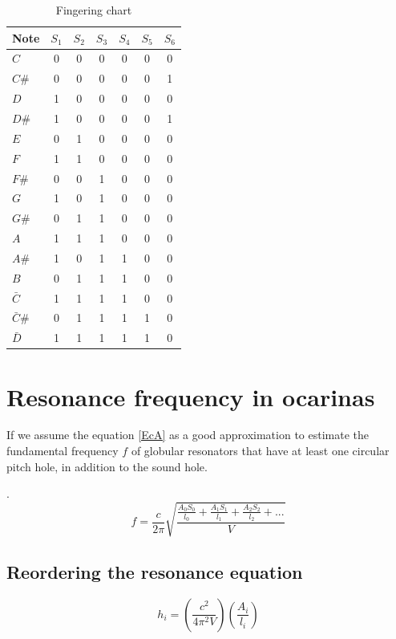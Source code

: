 \documentclass{article}
\begin{document}
\begin{table}[h]
\center
\begin{tabular}{l|c|c|c|c|c|c}
Note & $S_1$ & $S_2$ & $S_3$ & $S_4$ & $S_5$ & $S_6$ \\ \hline
\hline 
$C$  & 0 & 0 & 0 & 0 & 0 & 0 \\
$C\#$& 0 & 0 & 0 & 0 & 0 & 1 \\
$D$  & 1 & 0 & 0 & 0 & 0 & 0 \\
$D\#$& 1 & 0 & 0 & 0 & 0 & 1 \\
$E$  & 0 & 1 & 0 & 0 & 0 & 0 \\
$F$  & 1 & 1 & 0 & 0 & 0 & 0 \\
$F\#$& 0 & 0 & 1 & 0 & 0 & 0 \\
$G$  & 1 & 0 & 1 & 0 & 0 & 0 \\
$G\#$& 0 & 1 & 1 & 0 & 0 & 0 \\
$A$  & 1 & 1 & 1 & 0 & 0 & 0 \\
$A\#$& 1 & 0 & 1 & 1 & 0 & 0 \\
$B$  & 0 & 1 & 1 & 1 & 0 & 0 \\
$\bar{C}$& 1 & 1 & 1 & 1 & 0 & 0 \\
$\bar{C}\#$& 0 & 1 & 1 & 1 & 1 & 0 \\
$\bar{D}$& 1 & 1 & 1 & 1 & 1 & 0 \\ 
\hline 
\end{tabular}
\vspace{5pt}
\caption{Fingering chart}
\label{table:chart}
\end{table}

\section{Resonance frequency in ocarinas}


If we assume the equation \ref{EcA} as a good approximation to estimate the fundamental frequency $f$ 
of globular resonators that have at least one circular pitch hole, in addition to the sound hole. 

\cite[pp. 44]{cabreraestudio} \cite{1999air}.
\begin{equation} \label{EcA}
 f = \frac{c}{2 \pi} \sqrt{\frac{\frac{A_{0}S_{0}}{l_{0}}+\frac{A_{1}S_{1}}{l_{1}}+\frac{A_{2}S_{2}}{l_{2}}+ . . .}{V} }   
\end{equation}


\subsection{Reordering the resonance equation}
\begin{equation} \label{EcC}
 h_{i} =  \left( \frac{c^2}{4 {\pi}^2 V}\right) \left( \frac{A_{i}}{l_{i}}    \right)
\end{equation}
\end{document}

